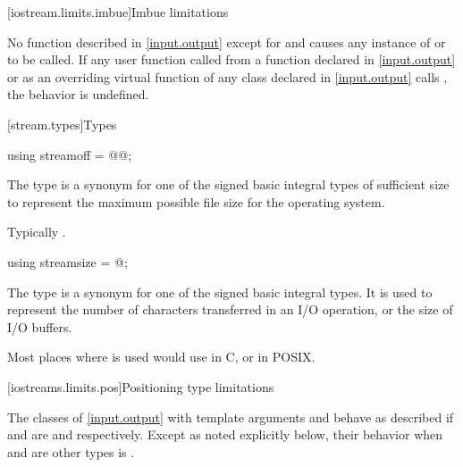 [iostream.limits.imbue]{Imbue limitations}

\pnum
No function described in \ref{input.output} except for
and 
causes any instance of
or
to be called.
If any user function called from a function declared in \ref{input.output} or
as an overriding virtual function of any class declared in \ref{input.output}
calls
,
the behavior is undefined.

[stream.types]{Types}

%
\begin{itemdecl}
using streamoff = @@;
\end{itemdecl}

\begin{itemdescr}
\pnum
The type  is a synonym for one of the signed basic integral types of
sufficient size to represent the maximum possible file size for the operating system.
\begin{footnote}
Typically .
\end{footnote}
\end{itemdescr}

%
\begin{itemdecl}
using streamsize = @\impdef@;
\end{itemdecl}

\begin{itemdescr}
\pnum
The type
is a synonym for one of the signed basic
integral types.
It is used to represent the number of characters transferred in an I/O
operation, or the size of I/O buffers.
\begin{footnote}
Most places where  is used would use  in C,
or  in POSIX.
\end{footnote}
\end{itemdescr}


[iostreams.limits.pos]{Positioning type limitations}

\pnum
The classes of \ref{input.output} with template arguments
and
behave as described if
and
are
and
respectively.
Except as noted explicitly below, their behavior when
and
are other types is
.

